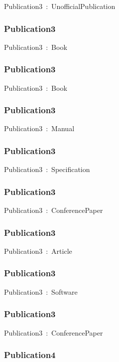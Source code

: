 \documentclass{article}
\begin{document}
Publication3~:~UnofficialPublication

\subsubsection*{Publication3}

Publication3~:~Book

\subsubsection*{Publication3}

Publication3~:~Book

\subsubsection*{Publication3}

Publication3~:~Manual

\subsubsection*{Publication3}

Publication3~:~Specification

\subsubsection*{Publication3}

Publication3~:~ConferencePaper

\subsubsection*{Publication3}

Publication3~:~Article

\subsubsection*{Publication3}

Publication3~:~Software

\subsubsection*{Publication3}

Publication3~:~ConferencePaper

\subsubsection*{Publication4}
\end{document}
